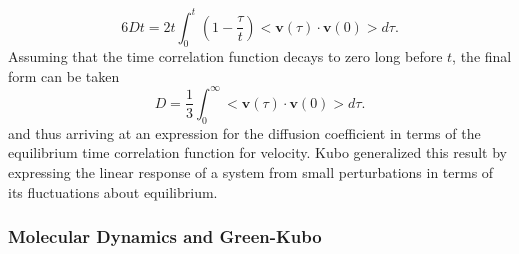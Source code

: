 %
\begin{equation}
6Dt=2t\int_0^t\left(1-\frac{\tau}{t}\right)<\bm{v}(\tau)\cdot\bm{v}(0)>d\tau.
\end{equation}
%
Assuming that the time correlation function decays to zero long before $t$, the final form can be taken
%
\begin{equation}
D=\frac{1}{3}\int_0^{\infty}<\bm{v}(\tau)\cdot\bm{v}(0)>d\tau.
\end{equation}
%
and thus arriving at an expression for the diffusion coefficient in terms of the equilibrium time correlation function for velocity. Kubo generalized this result by expressing the linear response of a system from small perturbations in terms of its fluctuations about equilibrium.

\subsubsection {Molecular Dynamics and Green-Kubo}

